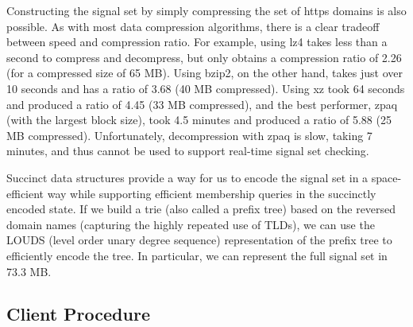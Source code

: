 Constructing the signal set by simply compressing the set of \ac{https} domains
is also possible. As with most data compression algorithms, there is a clear
tradeoff between speed and compression ratio. For example, using lz4
 takes less than a second to compress and decompress, but
only obtains a compression ratio of 2.26 (for a compressed size of 65 MB). Using
bzip2, on the other hand, takes just over 10 seconds and has a ratio of 3.68 (40
MB compressed). Using xz took 64 seconds and produced a ratio of 4.45 (33 MB
compressed), and the best performer, zpaq (with the largest block size), took
4.5 minutes and produced a ratio of 5.88 (25 MB compressed). Unfortunately,
decompression with zpaq is slow, taking 7 minutes, and thus cannot be used to
support real-time signal set checking.

Succinct data structures provide a way for us to encode the signal set in a
space-efficient way while supporting efficient membership queries in the
succinctly encoded state. If we build a trie (also called a prefix tree) based
on the reversed domain names (capturing the highly repeated use of TLDs), we can
use the LOUDS (level order unary degree sequence) representation of the prefix
tree to efficiently encode the tree. In particular, we can represent the full
signal set in 73.3 MB. 

\subsection{Client Procedure}

